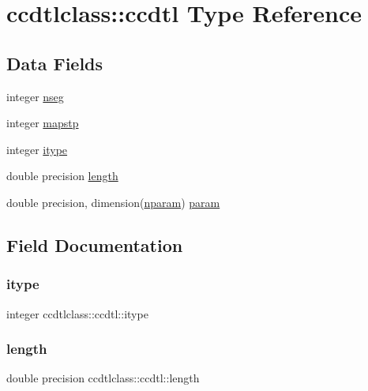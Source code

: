 \hypertarget{structccdtlclass_1_1ccdtl}{}\section{ccdtlclass\+::ccdtl Type Reference}
\label{structccdtlclass_1_1ccdtl}
\subsection*{Data Fields}
\begin{DoxyCompactItemize}
\item 
integer \mbox{\hyperlink{structccdtlclass_1_1ccdtl_a56759205b010998a69c2716e35e0d6d6}{nseg}}
\item 
integer \mbox{\hyperlink{structccdtlclass_1_1ccdtl_a646c337f17e8c188638d58449ea92b99}{mapstp}}
\item 
integer \mbox{\hyperlink{structccdtlclass_1_1ccdtl_aea542f9975283b5fd43c8f15a0d2762f}{itype}}
\item 
double precision \mbox{\hyperlink{structccdtlclass_1_1ccdtl_a367acb3cd3326d78cf47fe5c8891b80c}{length}}
\item 
double precision, dimension(\mbox{\hyperlink{namespaceccdtlclass_a0e8e95c86f2dab6639fc79f05859b6ea}{nparam}}) \mbox{\hyperlink{structccdtlclass_1_1ccdtl_a6b125e6ca6440736ab2272ad373cc24d}{param}}
\end{DoxyCompactItemize}


\subsection{Field Documentation}
\mbox{\label{structccdtlclass_1_1ccdtl_aea542f9975283b5fd43c8f15a0d2762f}} 
\subsubsection{\texorpdfstring{itype}{itype}}
{\footnotesize\ttfamily integer ccdtlclass\+::ccdtl\+::itype}

\mbox{\label{structccdtlclass_1_1ccdtl_a367acb3cd3326d78cf47fe5c8891b80c}} 
\subsubsection{\texorpdfstring{length}{length}}
{\footnotesize\ttfamily double precision ccdtlclass\+::ccdtl\+::length}

